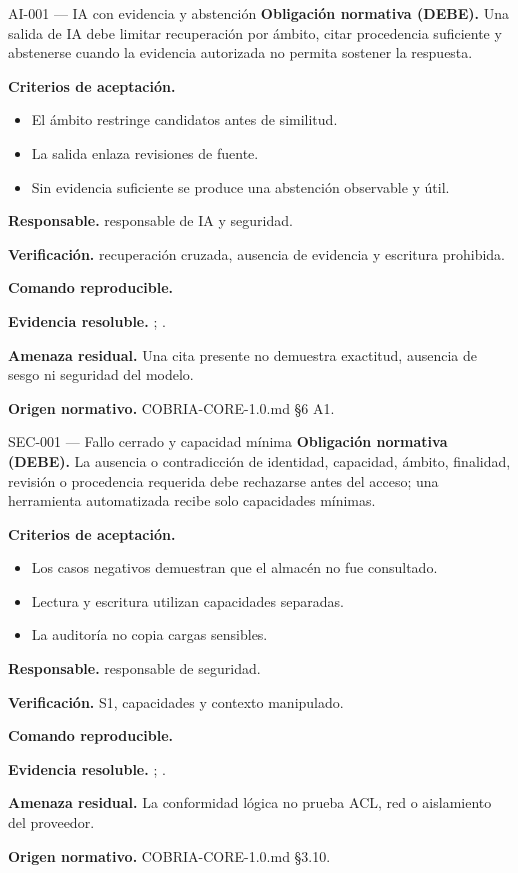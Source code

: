 \begin{requisito}{AI-001 --- IA con evidencia y abstención}
\textbf{Obligación normativa (DEBE).} Una salida de IA debe limitar recuperación por ámbito, citar procedencia suficiente y abstenerse cuando la evidencia autorizada no permita sostener la respuesta.\par
\textbf{Criterios de aceptación.}
\begin{itemize}
\item El ámbito restringe candidatos antes de similitud.
\item La salida enlaza revisiones de fuente.
\item Sin evidencia suficiente se produce una abstención observable y útil.
\end{itemize}
\textbf{Responsable.} responsable de IA y seguridad.\par
\textbf{Verificación.} recuperación cruzada, ausencia de evidencia y escritura prohibida.\par
\textbf{Comando reproducible.} \texttt{}\par
\textbf{Evidencia resoluble.} ; .\par
\textbf{Amenaza residual.} Una cita presente no demuestra exactitud, ausencia de sesgo ni seguridad del modelo.\par
\textbf{Origen normativo.} COBRIA-CORE-1.0.md §6 A1.
\end{requisito}
\begin{requisito}{SEC-001 --- Fallo cerrado y capacidad mínima}
\textbf{Obligación normativa (DEBE).} La ausencia o contradicción de identidad, capacidad, ámbito, finalidad, revisión o procedencia requerida debe rechazarse antes del acceso; una herramienta automatizada recibe solo capacidades mínimas.\par
\textbf{Criterios de aceptación.}
\begin{itemize}
\item Los casos negativos demuestran que el almacén no fue consultado.
\item Lectura y escritura utilizan capacidades separadas.
\item La auditoría no copia cargas sensibles.
\end{itemize}
\textbf{Responsable.} responsable de seguridad.\par
\textbf{Verificación.} S1, capacidades y contexto manipulado.\par
\textbf{Comando reproducible.} \texttt{}\par
\textbf{Evidencia resoluble.} ; .\par
\textbf{Amenaza residual.} La conformidad lógica no prueba ACL, red o aislamiento del proveedor.\par
\textbf{Origen normativo.} COBRIA-CORE-1.0.md §3.10.
\end{requisito}
